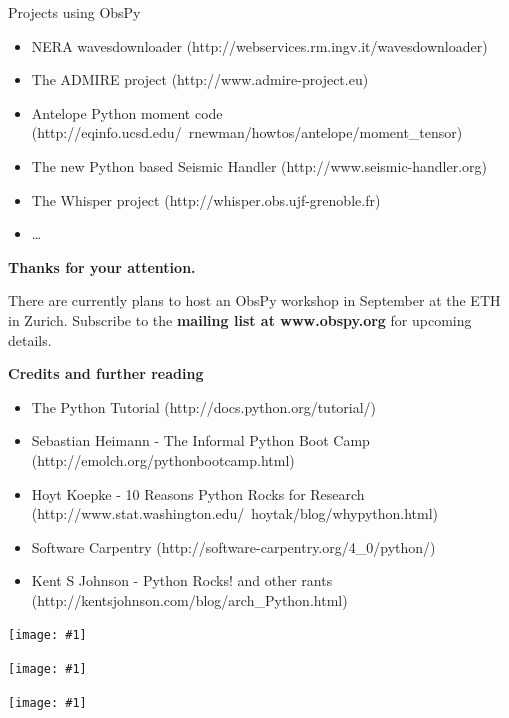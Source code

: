 \documentclass[handout]{beamer}
\newcommand{\maxFrameImage}[1]{
\begin{frame}[plain]
\begin{changemargin}{-1cm}{-1cm}
\begin{center}
\texttt{[image: \#1]}
\end{center}
\end{changemargin}
\end{frame}
}
\newenvironment{changemargin}[2]{%
\begin{list}{}{%
\setlength{\topsep}{0pt}%
\setlength{\leftmargin}{#1}%
\setlength{\rightmargin}{#2}%
\setlength{\listparindent}{\parindent}%
\setlength{\itemindent}{\parindent}%
\setlength{\parsep}{\parskip}%
}%
\item[]}{\end{list}}
\begin{document}
\begin{frame}[plain]{Projects using ObsPy}
    \begin{itemize}
        \item NERA wavesdownloader (http://webservices.rm.ingv.it/wavesdownloader)
        \item The ADMIRE project (http://www.admire-project.eu)
        \item Antelope Python moment code (http://eqinfo.ucsd.edu/~rnewman/howtos/antelope/moment\_tensor)
        \item The new Python based Seismic Handler (http://www.seismic-handler.org)
        \item The Whisper project (http://whisper.obs.ujf-grenoble.fr)
        \item \dots
    \end{itemize}
\end{frame}


\begin{frame}[plain]{}
    \large
    \begin{center}
        \textbf{Thanks for your attention.}
    \end{center}
    \normalsize
    \vspace{1.5em}
    \begin{center}
        There are currently plans to host an ObsPy workshop in September at the ETH in Zurich. Subscribe to the \textbf{mailing list at www.obspy.org} for upcoming details.
    \end{center}
    \textbf{Credits and further reading}
    \footnotesize
    \begin{itemize}
        \item The Python Tutorial (http://docs.python.org/tutorial/)
        \item Sebastian Heimann - The Informal Python Boot Camp (http://emolch.org/pythonbootcamp.html)
        \item Hoyt Koepke - 10 Reasons Python Rocks for Research (http://www.stat.washington.edu/~hoytak/blog/whypython.html)
        \item Software Carpentry (http://software-carpentry.org/4\_0/python/)
        \item Kent S Johnson - Python Rocks! and other rants (http://kentsjohnson.com/blog/arch\_Python.html)
    \end{itemize}
\end{frame}

\maxFrameImage{./images/overview_1.png}
\maxFrameImage{./images/overview_2.png}
\maxFrameImage{./images/obspyck.png}
\end{document}
